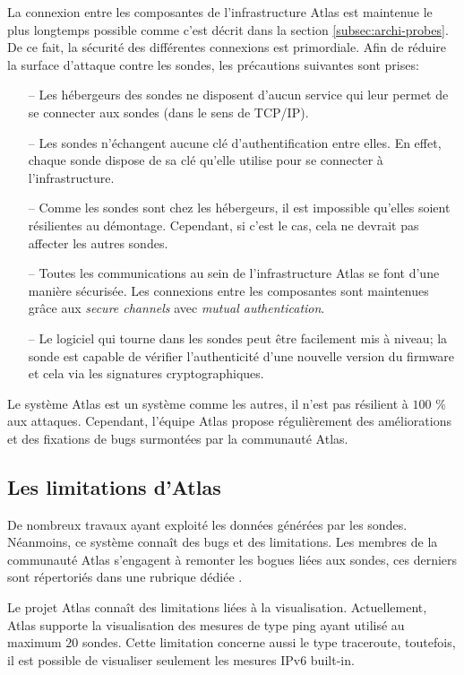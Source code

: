 La connexion entre les composantes de l'infrastructure  Atlas est maintenue le plus longtemps possible comme c'est décrit dans  la section \ref{subsec:archi-probes}. De ce fait, la sécurité des différentes connexions est primordiale. Afin de réduire la surface d'attaque contre les sondes, les précautions suivantes sont prises:

\begin{itemize}
	\item[--] Les  hébergeurs des sondes   ne disposent d'aucun service qui leur permet de se connecter aux sondes (dans le sens de TCP/IP).
	\item[--] Les sondes    n'échangent aucune clé d'authentification entre elles. En effet, chaque sonde dispose de sa clé qu'elle utilise pour se connecter à l'infrastructure.
	\item[--] Comme les sondes   sont chez les hébergeurs, il est impossible qu'elles soient résilientes au démontage. Cependant, si c'est le cas, cela ne devrait pas affecter les autres sondes.
	\item[--] Toutes les communications au sein de l'infrastructure  Atlas se font d'une manière sécurisée. Les connexions entre les composantes sont maintenues grâce aux \textit{secure channels} avec \textit{mutual authentication}.
	\item[--] Le logiciel qui tourne dans les sondes   peut être facilement mis à niveau; la sonde   est capable de vérifier l'authenticité d'une nouvelle version du firmware et cela via les signatures cryptographiques. 
\end{itemize}

Le système  Atlas est un système comme les autres, il n'est pas résilient à $100$ \% aux attaques. Cependant, l'équipe  Atlas propose régulièrement des améliorations et des fixations de bugs surmontées par la communauté  Atlas. 


\subsection{Les limitations d'Atlas}


De nombreux travaux ayant exploité les données générées par les sondes. Néanmoins, ce système connaît des bugs et des limitations. Les membres de la communauté  Atlas s'engagent à remonter les bogues liées aux sondes, ces derniers sont répertoriés dans une rubrique dédiée  \cite{bugs-ripe-atlas}.

Le projet Atlas connaît des limitations  liées à la visualisation. Actuellement,  Atlas supporte la visualisation des mesures de type ping ayant utilisé au maximum $20$  sondes. Cette limitation concerne aussi le type traceroute, toutefois,  il est possible de visualiser seulement les mesures IPv6 built-in.

